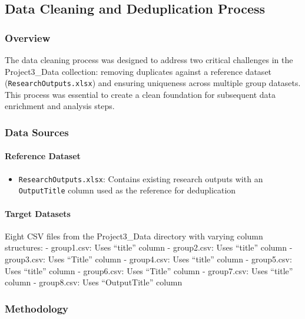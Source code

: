 \documentclass[12pt]{article}
\providecommand{\tightlist}{%
  \setlength{\itemsep}{0pt}\setlength{\parskip}{0pt}}
\begin{document}
\subsection{Data Cleaning and Deduplication
Process}\label{data-cleaning-and-deduplication-process}

\subsubsection{Overview}\label{overview}

The data cleaning process was designed to address two critical
challenges in the Project3\_Data collection: removing duplicates against
a reference dataset (\texttt{ResearchOutputs.xlsx}) and ensuring
uniqueness across multiple group datasets. This process was essential to
create a clean foundation for subsequent data enrichment and analysis
steps.

\subsubsection{Data Sources}\label{data-sources}

\paragraph{Reference Dataset}\label{reference-dataset}

\begin{itemize}
\tightlist
\item
  \texttt{ResearchOutputs.xlsx}: Contains existing research outputs with
  an \texttt{OutputTitle} column used as the reference for deduplication
\end{itemize}

\paragraph{Target Datasets}\label{target-datasets}

Eight CSV files from the Project3\_Data directory with varying column
structures: - group1.csv: Uses ``title'' column - group2.csv: Uses
``title'' column - group3.csv: Uses ``Title'' column - group4.csv: Uses
``title'' column - group5.csv: Uses ``title'' column - group6.csv: Uses
``Title'' column - group7.csv: Uses ``title'' column - group8.csv: Uses
``OutputTitle'' column

\subsubsection{Methodology}\label{methodology}
\end{document}
